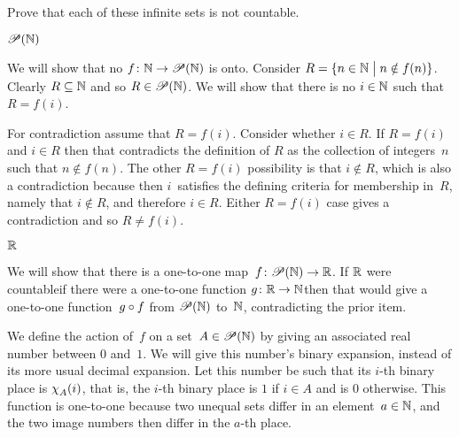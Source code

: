 \begin{problem}  Prove that each of these infinite sets is not countable.
\begin{exes}
\begin{exercise} 
  $\mathscr{P}(\mathbb{N})$ 
\end{exercise}
\begin{answer}
  We will show that no $\mbox{$f\colon \mathbb{N}\to \mathscr{P}(\mathbb{N})$}$ is onto.
  Consider $R=\{n\in\mathbb{N} \bigm| n\notin f(n)\}$.
  Clearly $R\subseteq \mathbb{N}$ and so $R\in\mathscr{P}(\mathbb{N})$.
  We will show that there is no $i\in\mathbb{N}$ such that $R=f(i)$.

  For contradiction assume that $R=f(i)$.
  Consider whether $i\in R$.
  If $R=f(i)$ and $i\in R$ then that contradicts the definition of $R$ as the 
  collection of integers~$n$ such that $n\notin f(n)$.
  The other $R=f(i)$ possibility is that $i\notin R$, which 
  is also a contradiction
  because then $i$~satisfies the defining criteria for membership in~$R$, namely
  that $i\notin R$, and therefore $i\in R$.
  Either $R=f(i)$ case gives a contradiction and so $R\neq f(i)$.
\end{answer}
\begin{exercise} 
  $\mathbb{R}$
\end{exercise}
\begin{answer}
  We will show that there is a one-to-one map~$\mbox{$f\colon \mathscr{P}(\mathbb{N})\to \mathbb{R}$}$.
  If $\mathbb{R}$ were countable\Dash if there were a one-to-one 
  function $\mbox{$g\colon \mathbb{R}\to \mathbb{N}$}$\Dash then 
  that would give a one-to-one function~$g\mathbin{\circ} f$ 
  from $\mathscr{P}(\mathbb{N})$ to~$\mathbb{N}$,
  contradicting the prior item.

  We define the action of~$f$ on a set~$A\in\mathscr{P}(\mathbb{N})$ by
  giving an associated real number between $0$ and~$1$.
  We will give this number's binary expansion, instead of its more usual
  decimal expansion. 
  Let this number be such that its $i$-th binary place is $\charfcn{A}(i)$,
  that is, the $i$-th binary place is $1$ if $i\in A$ and is $0$ otherwise. 
  This function is one-to-one because two unequal sets differ in an 
  element~$a\in\mathbb{N}$, and the two image numbers then differ in the $a$-th place.  
\end{answer}
\end{exes}


\end{problem}
